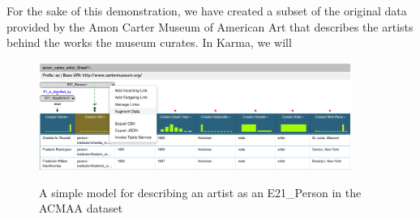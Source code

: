 For the sake of this demonstration, we have created a subset of the original data provided by the Amon Carter Museum of American Art that describes the artists behind the works the museum curates.  In Karma, we will 



\begin{figure}
\begin{center}
\includegraphics[width=4.0in]{4-simple-model.png}
\vspace{-3mm}
\caption{A simple model for describing an artist as an E21\_Person in the ACMAA dataset}
\vspace{-2mm}
\label{fig:simple-model-screenshot}
\end{center}
\vspace{-1.5em}
\end{figure}


